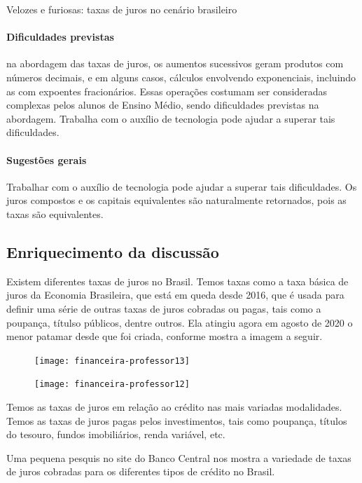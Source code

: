 \begin{paginatexto}{Velozes e furiosas: taxas de juros no cenário brasileiro}
\paragraph{Dificuldades previstas} na abordagem das taxas de juros, os aumentos sucessivos geram produtos com números decimais, e em alguns casos, cálculos envolvendo exponenciais, incluindo as com expoentes fracionários. Essas operações costumam ser consideradas complexas pelos alunos de Ensino Médio, sendo dificuldades previstas na abordagem. Trabalha com o auxílio de tecnologia pode ajudar a superar tais dificuldades.

\paragraph{Sugestões gerais} Trabalhar com o auxílio de tecnologia pode ajudar a superar tais dificuldades. Os juros compostos e os capitais equivalentes são naturalmente retornados, pois as taxas são equivalentes.

\subsection*{Enriquecimento da discussão}

Existem diferentes taxas de juros no Brasil. Temos taxas como a taxa básica de juros da Economia Brasileira, que está em queda desde 2016, que é usada para definir uma série de outras taxas de juros cobradas ou pagas, tais como a poupança, títulso públicos, dentre outros. Ela atingiu agora em agosto de 2020 o menor patamar desde que foi criada, conforme mostra a imagem a seguir.

\begin{figure}[H]
\centering

\texttt{[image: financeira-professor13]}
\end{figure}

\begin{figure}[H]
\centering

\texttt{[image: financeira-professor12]}
\end{figure}


Temos as taxas de juros em relação ao crédito nas mais variadas modalidades. Temos as taxas de juros pagas pelos investimentos, tais como poupança, títulos do tesouro, fundos imobiliários, renda variável, etc.

Uma pequena pesquis  no site do Banco Central nos mostra a variedade de taxas de juros cobradas para os diferentes tipos de crédito no Brasil.


\end{paginatexto}
